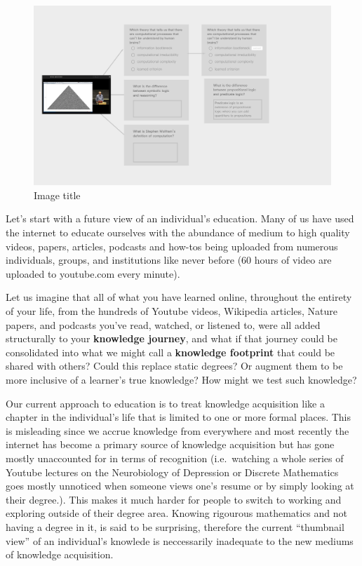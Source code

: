 \documentclass[]{book}
\theoremstyle{definition}
\theoremstyle{definition}
\theoremstyle{definition}
\theoremstyle{remark}
\begin{document}
\begin{figure}
\centering
\includegraphics{img/MtoQA.png}
\caption{Image title}
\end{figure}

Let's start with a future view of an individual's education. Many of us
have used the internet to educate ourselves with the abundance of medium
to high quality videos, papers, articles, podcasts and how-tos being
uploaded from numerous individuals, groups, and institutions like never
before (60 hours of video are uploaded to youtube.com every minute).

Let us imagine that all of what you have learned online, throughout the
entirety of your life, from the hundreds of Youtube videos, Wikipedia
articles, Nature papers, and podcasts you've read, watched, or listened
to, were all added structurally to your \textbf{knowledge journey}, and
what if that journey could be consolidated into what we might call a
\textbf{knowledge footprint} that could be shared with others? Could
this replace static degrees? Or augment them to be more inclusive of a
learner's true knowledge? How might we test such knowledge?

Our current approach to education is to treat knowledge acquisition like
a chapter in the individual's life that is limited to one or more formal
places. This is misleading since we accrue knowledge from everywhere and
most recently the internet has become a primary source of knowledge
acquisition but has gone mostly unaccounted for in terms of recognition
(i.e.~watching a whole series of Youtube lectures on the Neurobiology of
Depression or Discrete Mathematics goes mostly unnoticed when someone
views one's resume or by simply looking at their degree.). This makes it
much harder for people to switch to working and exploring outside of
their degree area. Knowing rigourous mathematics and not having a degree
in it, is said to be surprising, therefore the current ``thumbnail
view'' of an individual's knowlede is neccessarily inadequate to the new
mediums of knowledge acquisition.
\end{document}
